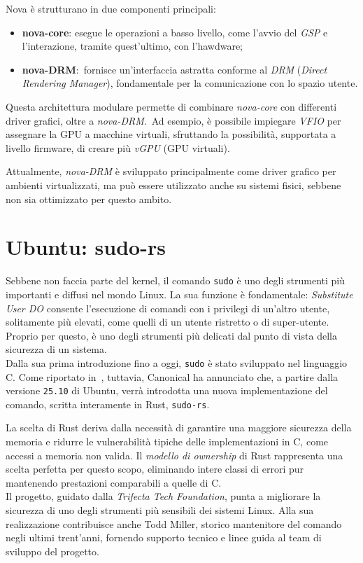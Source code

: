 Nova è strutturano in due componenti principali:
\begin{itemize}
    \item \textbf{nova-core}: esegue le operazioni a basso livello, come l'avvio del \textit{GSP} e l'interazione, tramite quest'ultimo, con l'hawdware;
    \item \textbf{nova-DRM}:\  fornisce un'interfaccia astratta conforme al \textit{DRM} (\textit{Direct Rendering Manager}), fondamentale per la comunicazione con lo spazio utente.
\end{itemize}
Questa architettura modulare permette di combinare \textit{nova-core} con differenti driver grafici, oltre a \textit{nova-DRM}.\ 
Ad esempio, è possibile impiegare \textit{VFIO} per assegnare la GPU a macchine virtuali, sfruttando la possibilità, supportata a livello firmware, di creare più \textit{vGPU} (GPU virtuali). 

Attualmente, \textit{nova-DRM} è sviluppato principalmente come driver grafico per ambienti virtualizzati, ma può essere utilizzato anche su sistemi fisici, sebbene non sia ottimizzato per questo ambito.

\section{Ubuntu: sudo-rs}
Sebbene non faccia parte del kernel, il comando \texttt{sudo} è uno degli strumenti più importanti e diffusi nel mondo Linux.
La sua funzione è fondamentale: \textit{Substitute User DO} consente l'esecuzione di comandi con i privilegi di un'altro utente, solitamente più elevati,
come quelli di un utente ristretto o di super-utente.
Proprio per questo, è uno degli strumenti più delicati dal punto di vista della sicurezza di un sistema. \hfill
\vspace{5pt}\\
\noindent Dalla sua prima introduzione fino a oggi, \texttt{sudo} è stato sviluppato nel linguaggio C. Come riportato in~\cite{ubuntu-sudo-rs}, tuttavia, Canonical ha annunciato che,
a partire dalla versione \texttt{25.10} di Ubuntu, verrà introdotta una nuova implementazione del comando, scritta interamente in Rust, \texttt{sudo-rs}.

La scelta di Rust deriva dalla necessità di garantire una maggiore sicurezza della memoria e ridurre le vulnerabilità
tipiche delle implementazioni in C, come accessi a memoria non valida. Il \textit{modello di ownership} di Rust 
rappresenta una scelta perfetta per questo scopo, eliminando intere classi di errori pur mantenendo prestazioni comparabili a quelle di C. \hfill
\vspace{10pt}\\
\noindent Il progetto, guidato dalla \textit{Trifecta Tech Foundation}, punta a migliorare la sicurezza di uno degli strumenti più sensibili dei sistemi Linux.
Alla sua realizzazione contribuisce anche Todd Miller, storico mantenitore del comando negli ultimi trent'anni, fornendo supporto tecnico e linee guida 
al team di sviluppo del progetto.

